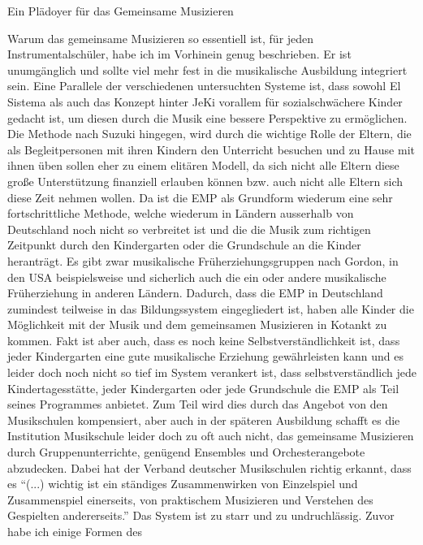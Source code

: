Ein Plädoyer für das Gemeinsame Musizieren

Warum das gemeinsame Musizieren so essentiell ist, für jeden
Instrumentalschüler, habe ich im Vorhinein genug beschrieben. Er ist
unumgänglich und sollte viel mehr fest in die musikalische Ausbildung integriert
sein. 
Eine Parallele der verschiedenen untersuchten Systeme ist, dass sowohl El Sistema als auch das Konzept hinter JeKi vorallem
für sozialschwächere Kinder gedacht ist, um diesen durch die Musik eine bessere
Perspektive zu ermöglichen. Die Methode nach Suzuki hingegen, wird durch die
wichtige Rolle der Eltern, die als Begleitpersonen mit ihren Kindern den
Unterricht besuchen und zu Hause mit ihnen üben sollen eher zu einem elitären
Modell, da sich nicht alle Eltern diese große Unterstützung finanziell erlauben
können bzw. auch nicht alle Eltern sich diese Zeit nehmen wollen. 
Da ist die EMP als Grundform wiederum eine sehr fortschrittliche Methode, welche
wiederum in Ländern ausserhalb von Deutschland noch nicht so verbreitet ist und die die Musik zum
richtigen Zeitpunkt durch den Kindergarten oder die Grundschule an die Kinder
heranträgt. Es gibt zwar musikalische Früherziehungsgruppen nach Gordon, in den
USA beispielsweise und sicherlich auch die ein oder andere musikalische
Früherziehung in anderen Ländern. Dadurch, dass die EMP in Deutschland zumindest teilweise in das Bildungssystem
eingegliedert ist, haben
alle Kinder die Möglichkeit mit der Musik und dem gemeinsamen Musizieren in
Kotankt zu kommen. Fakt ist aber auch, dass es noch keine Selbstverständlichkeit
ist, dass jeder Kindergarten eine gute musikalische Erziehung gewährleisten kann
und es leider doch noch nicht so tief im System verankert ist, dass
selbstverständlich jede Kindertagesstätte, jeder Kindergarten oder jede Grundschule die EMP als Teil seines Programmes
anbietet. Zum Teil wird dies durch das Angebot von den Musikschulen kompensiert,
aber auch in der späteren Ausbildung schafft es die Institution Musikschule
leider doch zu oft auch nicht, das gemeinsame Musizieren durch
Gruppenunterrichte, genügend Ensembles und Orchesterangebote abzudecken. Dabei
hat der Verband deutscher Musikschulen richtig erkannt, dass es \enquote{(...)
wichtig ist ein ständiges Zusammenwirken von Einzelspiel und Zusammenspiel
einerseits, von praktischem Musizieren und Verstehen des Gespielten
andererseits.} \autocite[22]{losert:die_kunst_zu_unterrichten}
Das System ist zu starr und zu undruchlässig. Zuvor habe ich einige Formen des
